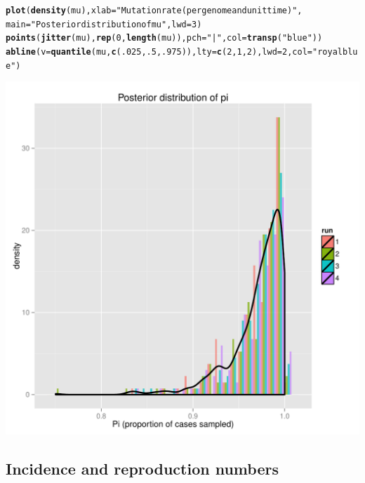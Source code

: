 \documentclass{article}\usepackage[]{graphicx}\usepackage[]{color}
\makeatletter
\newcommand{\hlnum}[1]{\textcolor[rgb]{0.686,0.059,0.569}{#1}}%
\newcommand{\hlstr}[1]{\textcolor[rgb]{0.192,0.494,0.8}{#1}}%
\newcommand{\hlstd}[1]{\textcolor[rgb]{0.345,0.345,0.345}{#1}}%
\newcommand{\hlkwc}[1]{\textcolor[rgb]{0.333,0.667,0.333}{#1}}%
\newcommand{\hlkwd}[1]{\textcolor[rgb]{0.737,0.353,0.396}{\textbf{#1}}}%
\newenvironment{kframe}{%
 \def\at@end@of@kframe{}%
 \ifinner\ifhmode%
  \def\at@end@of@kframe{\end{minipage}}%
  \begin{minipage}{\columnwidth}%
 \fi\fi%
 \def\FrameCommand##1{\hskip\@totalleftmargin \hskip-\fboxsep
 \colorbox{shadecolor}{##1}\hskip-\fboxsep
     \hskip-\linewidth \hskip-\@totalleftmargin \hskip\columnwidth}%
 \MakeFramed {\advance\hsize-\width
   \@totalleftmargin\z@ \linewidth\hsize
   \@setminipage}}%
 {\par\unskip\endMakeFramed%
 \at@end@of@kframe}
\newenvironment{knitrout}{}{} %
\makeatother
\begin{document}
\begin{knitrout}
\color{fgcolor}\begin{kframe}
\begin{alltt}
\hlkwd{plot}\hlstd{(}\hlkwd{density}\hlstd{(mu),} \hlkwc{xlab}\hlstd{=}\hlstr{"Mutation rate (per genome and unit time)"}\hlstd{,}
     \hlkwc{main}\hlstd{=}\hlstr{"Posterior distribution of mu"}\hlstd{,} \hlkwc{lwd}\hlstd{=}\hlnum{3}\hlstd{)}
\hlkwd{points}\hlstd{(}\hlkwd{jitter}\hlstd{(mu),} \hlkwd{rep}\hlstd{(}\hlnum{0}\hlstd{,} \hlkwd{length}\hlstd{(mu)),} \hlkwc{pch}\hlstd{=}\hlstr{"|"}\hlstd{,} \hlkwc{col}\hlstd{=}\hlkwd{transp}\hlstd{(}\hlstr{"blue"}\hlstd{))}
\hlkwd{abline}\hlstd{(}\hlkwc{v}\hlstd{=}\hlkwd{quantile}\hlstd{(mu,} \hlkwd{c}\hlstd{(}\hlnum{.025}\hlstd{,} \hlnum{.5}\hlstd{,} \hlnum{.975}\hlstd{)),} \hlkwc{lty}\hlstd{=}\hlkwd{c}\hlstd{(}\hlnum{2}\hlstd{,}\hlnum{1}\hlstd{,}\hlnum{2}\hlstd{),} \hlkwc{lwd}\hlstd{=}\hlnum{2}\hlstd{,} \hlkwc{col}\hlstd{=}\hlstr{"royalblue"}\hlstd{)}
\end{alltt}
\end{kframe}

{\centering \includegraphics[width=.6\textwidth]{figs/unnamed-chunk-39} 

}



\end{knitrout}






\subsection{Incidence and reproduction numbers}
\end{document}
